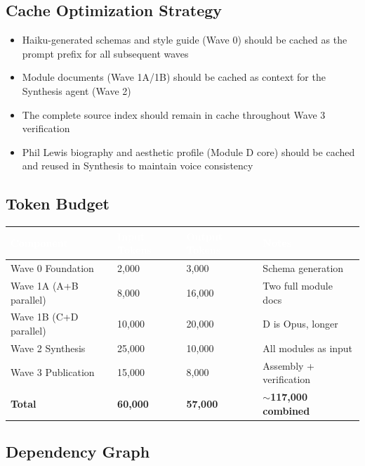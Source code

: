 \documentclass[11pt,letterpaper]{article}
\newcommand{\tableheader}[1]{\textbf{\sffamily\textcolor{white}{#1}}}
\begin{document}
\subsection{Cache Optimization Strategy}

\begin{itemize}[noitemsep]
  \item Haiku-generated schemas and style guide (Wave 0) should be cached as the prompt prefix for all subsequent waves
  \item Module documents (Wave 1A/1B) should be cached as context for the Synthesis agent (Wave 2)
  \item The complete source index should remain in cache throughout Wave 3 verification
  \item Phil Lewis biography and aesthetic profile (Module D core) should be cached and reused in Synthesis to maintain voice consistency
\end{itemize}

\subsection{Token Budget}

\begin{center}
\begin{tabularx}{\textwidth}{L{4cm}C{2cm}C{2cm}X}
\toprule
{}
\tableheader{Component} & \tableheader{Input Tokens} & \tableheader{Output Tokens} & \tableheader{Notes} \\
\midrule
Wave 0 Foundation & 2,000 & 3,000 & Schema generation \\
Wave 1A (A+B parallel) & 8,000 & 16,000 & Two full module docs \\
Wave 1B (C+D parallel) & 10,000 & 20,000 & D is Opus, longer \\
Wave 2 Synthesis & 25,000 & 10,000 & All modules as input \\
Wave 3 Publication & 15,000 & 8,000 & Assembly + verification \\
\midrule
\textbf{Total} & \textbf{60,000} & \textbf{57,000} & \textbf{$\sim$117,000 combined} \\
\bottomrule
\end{tabularx}
\end{center}

\subsection{Dependency Graph}
\end{document}
